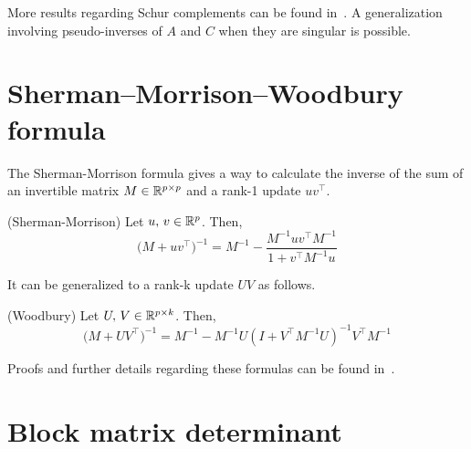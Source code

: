 More results regarding Schur complements can be found in~\cite{schur_complement}.
A generalization involving pseudo-inverses of $A$ and $C$ when they are singular is possible.

\section{Sherman–Morrison–Woodbury formula}\label{sec:sherman}

The Sherman-Morrison formula gives a way to calculate the inverse of the sum of an invertible matrix
$M \in \mathbb{R}^{p \times p}$
and a rank-1 update $uv^\top$.
\begin{lemma}
    (Sherman-Morrison) Let $u,\, v \in \mathbb{R}^p$.
    Then,
    \begin{equation*}
        \big( M + uv^\top \big)^{-1} = M^{-1} - \frac{M^{-1}uv^\top M^{-1}}{1 + v^\top M^{-1}u}
    \end{equation*}
\end{lemma}
It can be generalized to a rank-k update $UV$ as follows.
\begin{lemma}
    (Woodbury) Let $U,\, V \in \mathbb{R}^{p \times k}$.
    Then,
    \begin{equation*}
        \big( M + UV^\top \big)^{-1} = M^{-1} - M^{-1}U \left( I + V^\top M^{-1}U \right)^{-1}V^\top M^{-1}
    \end{equation*}
\end{lemma}
Proofs and further details regarding these formulas can be found in~\cite{woodbury}.

\section{Block matrix determinant}\label{sec:block_matrix_det}

